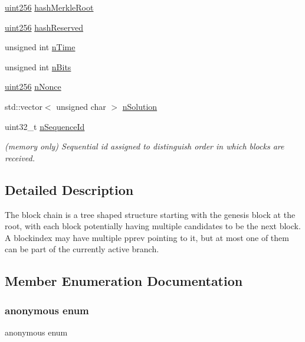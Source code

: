 \begin{DoxyCompactItemize}
\mbox{\hyperlink{classuint256}{uint256}} \mbox{\hyperlink{class_c_block_index_a0601b6b2bd6eaedfbc283c00d045a21c}{hash\+Merkle\+Root}}
\item 
\mbox{\hyperlink{classuint256}{uint256}} \mbox{\hyperlink{class_c_block_index_a5e7cea2f350f0f6272cfc291de91cd6b}{hash\+Reserved}}
\item 
unsigned int \mbox{\hyperlink{class_c_block_index_a4b687a226e9e166b0f91c1b616b543a6}{n\+Time}}
\item 
unsigned int \mbox{\hyperlink{class_c_block_index_a3324894e6af612d1bd76f89378435713}{n\+Bits}}
\item 
\mbox{\hyperlink{classuint256}{uint256}} \mbox{\hyperlink{class_c_block_index_a6cd6b15ad3a4cc502aeebfab8ec9e4d6}{n\+Nonce}}
\item 
std\+::vector$<$ unsigned char $>$ \mbox{\hyperlink{class_c_block_index_afc393de336d759ed0e1fafd48470f437}{n\+Solution}}
\item 
uint32\+\_\+t \mbox{\hyperlink{class_c_block_index_a4a679af5f7924cc594b8131371b21e54}{n\+Sequence\+Id}}
\begin{DoxyCompactList}\small\item\em (memory only) Sequential id assigned to distinguish order in which blocks are received. \end{DoxyCompactList}\end{DoxyCompactItemize}


\subsection{Detailed Description}
The block chain is a tree shaped structure starting with the genesis block at the root, with each block potentially having multiple candidates to be the next block. A blockindex may have multiple pprev pointing to it, but at most one of them can be part of the currently active branch. 

\subsection{Member Enumeration Documentation}
\mbox{\label{class_c_block_index_acefc16035e60d7bd52ed2c9bb1aa838e}} 
\subsubsection{\texorpdfstring{anonymous enum}{anonymous enum}}
{\footnotesize\ttfamily anonymous enum}


